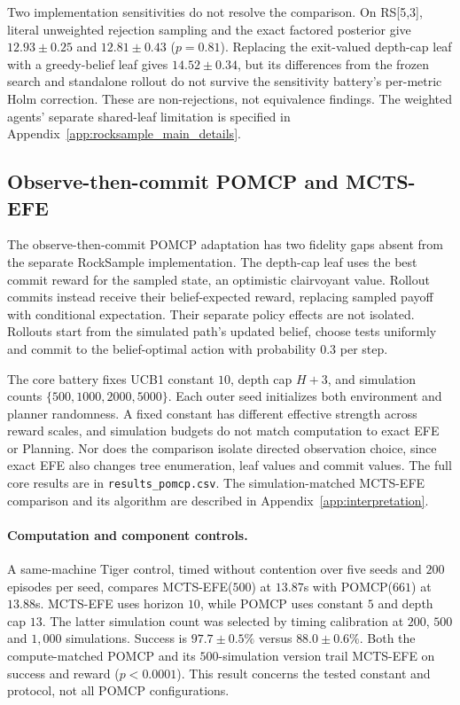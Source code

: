 Two implementation sensitivities do not resolve the comparison. On RS[5,3], literal unweighted rejection sampling and the exact factored posterior give $12.93\pm0.25$ and $12.81\pm0.43$ ($p=0.81$). Replacing the exit-valued depth-cap leaf with a greedy-belief leaf gives $14.52\pm0.34$, but its differences from the frozen search and standalone rollout do not survive the sensitivity battery's per-metric Holm correction. These are non-rejections, not equivalence findings. The weighted agents' separate shared-leaf limitation is specified in Appendix~\ref{app:rocksample_main_details}.

\subsection{Observe-then-commit POMCP and MCTS-EFE}
\label{app:pomcp}

The observe-then-commit POMCP adaptation \citep{silver2010} has two fidelity gaps absent from the separate RockSample implementation. The depth-cap leaf uses the best commit reward for the sampled state, an optimistic clairvoyant value. Rollout commits instead receive their belief-expected reward, replacing sampled payoff with conditional expectation. Their separate policy effects are not isolated. Rollouts start from the simulated path's updated belief, choose tests uniformly and commit to the belief-optimal action with probability $0.3$ per step.

The core battery fixes UCB1 constant $10$, depth cap $H+3$, and simulation counts $\{500,1000,2000,5000\}$. Each outer seed initializes both environment and planner randomness. A fixed constant has different effective strength across reward scales, and simulation budgets do not match computation to exact EFE or Planning. Nor does the comparison isolate directed observation choice, since exact EFE also changes tree enumeration, leaf values and commit values. The full core results are in \texttt{results\_pomcp.csv}. The simulation-matched MCTS-EFE comparison and its algorithm are described in Appendix~\ref{app:interpretation}.

\paragraph{Computation and component controls.}
A same-machine Tiger control, timed without contention over five seeds and $200$ episodes per seed, compares MCTS-EFE($500$) at $13.87$s with POMCP($661$) at $13.88$s. MCTS-EFE uses horizon $10$, while POMCP uses constant $5$ and depth cap $13$. The latter simulation count was selected by timing calibration at $200$, $500$ and $1{,}000$ simulations. Success is $97.7\pm0.5\%$ versus $88.0\pm0.6\%$. Both the compute-matched POMCP and its $500$-simulation version trail MCTS-EFE on success and reward ($p<0.0001$). This result concerns the tested constant and protocol, not all POMCP configurations.

